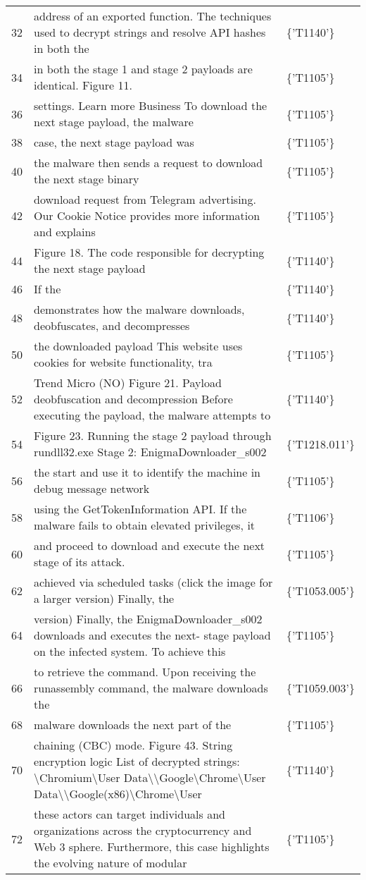 \begin{tabular}{rll}
32 & address of an exported function. The techniques used to decrypt strings and resolve API hashes in both the & \{'T1140'\} \\
34 & in both the stage 1 and stage 2 payloads are identical. Figure 11. & \{'T1105'\} \\
36 & settings. Learn more Business   To download the next stage payload, the malware  & \{'T1105'\} \\
38 & case, the next stage payload was  & \{'T1105'\} \\
40 & the malware then sends a request to download the next stage binary  & \{'T1105'\} \\
42 & download request from Telegram advertising. Our Cookie Notice provides more information and explains & \{'T1105'\} \\
44 & Figure 18. The code responsible for decrypting the next stage payload  & \{'T1140'\} \\
46 & If the  & \{'T1140'\} \\
48 & demonstrates how the malware downloads, deobfuscates, and decompresses  & \{'T1140'\} \\
50 & the downloaded payload   This website uses cookies for website functionality, tra & \{'T1105'\} \\
52 &   Trend Micro (NO) Figure 21. Payload deobfuscation and decompression Before executing the payload, the malware attempts to & \{'T1140'\} \\
54 & Figure 23. Running the stage 2 payload through rundll32.exe Stage 2: EnigmaDownloader\_s002   & \{'T1218.011'\} \\
56 & the start and use it to identify the machine in debug message network & \{'T1105'\} \\
58 & using the GetTokenInformation API. If the malware fails to obtain elevated privileges, it & \{'T1106'\} \\
60 & and proceed to download and execute the next stage of its attack.   & \{'T1105'\} \\
62 & achieved via scheduled tasks (click the image for a larger version) Finally, the & \{'T1053.005'\} \\
64 & version) Finally, the EnigmaDownloader\_s002 downloads and executes the next- stage payload on the infected system. To achieve this & \{'T1105'\} \\
66 & to retrieve the command. Upon receiving the runassembly command, the malware downloads the & \{'T1059.003'\} \\
68 & malware downloads the next part of the  & \{'T1105'\} \\
70 & chaining (CBC) mode. Figure 43. String encryption logic List of decrypted strings: \textbackslash Chromium\textbackslash User Data\textbackslash \space   \textbackslash Google\textbackslash Chrome\textbackslash User Data\textbackslash \space \textbackslash Google(x86)\textbackslash Chrome\textbackslash User & \{'T1140'\} \\
72 & these actors can target individuals and organizations across the cryptocurrency and Web 3 sphere. Furthermore, this case highlights the evolving nature of modular & \{'T1105'\} \\
\bottomrule
\end{tabular}
